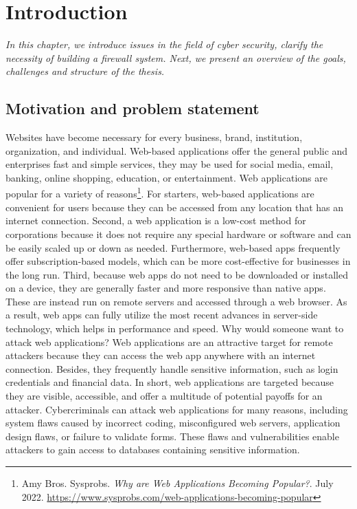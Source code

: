 \chapter{Introduction}
\label{chap:introduction} 
	\textit{\hspace{0.5cm}In this chapter, we introduce issues in the field of cyber security, clarify the necessity of building a firewall system. Next, we present an overview of the goals, challenges and structure of the thesis.}
\minitoc

\section{Motivation and problem statement}
\label{sec:motivation}
\hspace{0.5cm}Websites have become necessary for every business, brand, institution, organization, and individual. Web-based applications offer the general public and enterprises fast and simple services, they may be used for social media, email, banking, online shopping, education, or entertainment. Web applications are popular for a variety of reasons\footnote{Amy Bros. Sysprobs. \textit{Why are Web Applications Becoming Popular?}. July 2022. \url{https://www.sysprobs.com/web-applications-becoming-popular}}. For starters, web-based applications are convenient for users because they can be accessed from any location that has an internet connection. Second, a web application is a low-cost method for corporations because it does not require any special hardware or software and can be easily scaled up or down as needed. Furthermore, web-based apps frequently offer subscription-based models, which can be more cost-effective for businesses in the long run. Third, because web apps do not need to be downloaded or installed on a device, they are generally faster and more responsive than native apps. These are instead run on remote servers and accessed through a web browser. As a result, web apps can fully utilize the most recent advances in server-side technology, which helps in performance and speed. Why would someone want to attack web applications? Web applications are an attractive target for remote attackers because they can access the web app anywhere with an internet connection. Besides, they frequently handle sensitive information, such as login credentials and financial data. In short, web applications are targeted because they are visible, accessible, and offer a multitude of potential payoffs for an attacker. Cybercriminals can attack web applications for many reasons, including system flaws caused by incorrect coding, misconfigured web servers, application design flaws, or failure to validate forms. These flaws and vulnerabilities enable attackers to gain access to databases containing sensitive information. 


